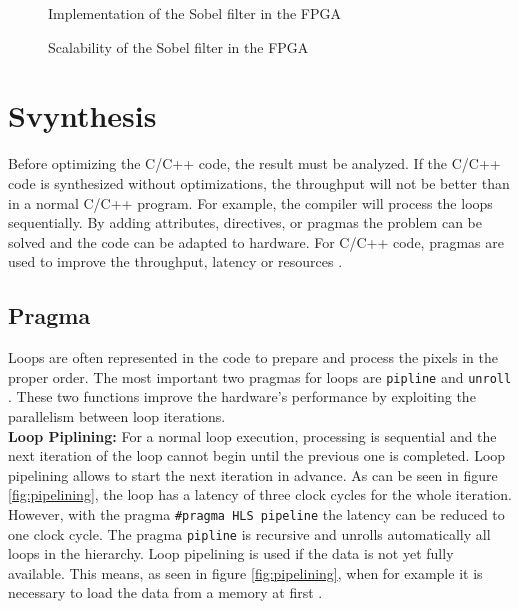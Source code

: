 \begin{figure}[h!]
    \centering
    \begin{adjustbox}{width=0.8\textwidth}
        
    \end{adjustbox}
    \caption{Implementation of the Sobel filter in the FPGA}
    \label{fig:impl_sobel}
\end{figure}

\begin{figure}[h!]
    \centering
    \begin{adjustbox}{width=0.8\textwidth}
    	
    \end{adjustbox}
    \caption{Scalability of the Sobel filter in the FPGA}
    \label{fig:impl_sobel2}
\end{figure}



\section{Svynthesis}
Before optimizing the C/C++ code, the result must be analyzed. If the C/C++ code is synthesized without optimizations, the throughput will not be better than in a normal C/C++ program. For example, the compiler will process the loops sequentially. By adding attributes, directives, or pragmas the problem can be solved and the code can be adapted to hardware. For C/C++ code, pragmas are used to improve the throughput, latency or resources \cite{vivado_synthesis}. 


\subsection{Pragma}
Loops are often represented in the code to prepare and process the pixels in the proper order. The most important two pragmas for loops are \texttt{pipline} and \texttt{unroll} \cite{pragma}. These two functions improve the hardware's performance by exploiting the parallelism between loop iterations. \\

\textbf{Loop Piplining:} For a normal loop execution, processing is sequential and the next iteration of the loop cannot begin until the previous one is completed. Loop pipelining allows to start the next iteration in advance. 
As can be seen in figure \ref{fig:pipelining}, the loop has a latency of three clock cycles for the whole iteration. However, with the pragma \texttt{\#pragma HLS pipeline} the latency can be reduced to one clock cycle.
The pragma \texttt{pipline} is recursive and unrolls automatically all loops in the hierarchy. 
Loop pipelining is used if the data is not yet fully available. This means, as seen in figure \ref{fig:pipelining}, when for example it is necessary to load the data from a memory at first \cite{pragma}. \\


